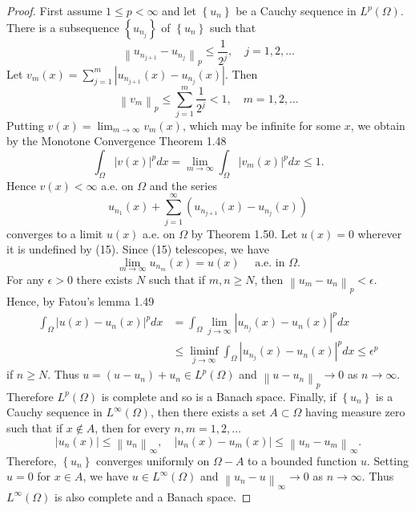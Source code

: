 \begin{proof}
  First assume $1 \leq p<\infty$ and let $\left\{u_n\right\}$ be a Cauchy sequence in $L^p(\Omega)$. There is a subsequence $\left\{u_{n_j}\right\}$ of $\left\{u_n\right\}$ such that
  \[
  \left\|u_{n_{j+1}}-u_{n_j}\right\|_p \leq \frac{1}{2^j}, \quad j=1,2, \ldots
  \]
  Let $v_m(x)=\sum_{j=1}^m\left|u_{n_{j+1}}(x)-u_{n_j}(x)\right|$. Then
  \[
  \left\|v_m\right\|_p \leq \sum_{j=1}^m \frac{1}{2^j}<1, \quad m=1,2, \ldots
  \]
  Putting $v(x)=\lim _{m \rightarrow \infty} v_m(x)$, which may be infinite for some $x$, we obtain by the Monotone Convergence Theorem 1.48
  \[
  \int_{\Omega}|v(x)|^p d x=\lim _{m \rightarrow \infty} \int_{\Omega}\left|v_m(x)\right|^p d x \leq 1 .
  \]
  Hence $v(x)<\infty$ a.e. on $\Omega$ and the series
  \begin{equation}\label{eq:2.15}
  u_{n_1}(x)+\sum_{j=1}^{\infty}\left(u_{n_{j+1}}(x)-u_{n_j}(x)\right)
  \end{equation}
  converges to a limit $u(x)$ a.e. on $\Omega$ by Theorem 1.50. Let $u(x)=0$ wherever it is undefined by (15). Since (15) telescopes, we have
  \[
  \lim _{m \rightarrow \infty} u_{n_m}(x)=u(x) \quad \text { a.e. in } \Omega.
  \]
  For any $\epsilon>0$ there exists $N$ such that if $m, n \geq N$, then $\left\|u_m-u_n\right\|_p<\epsilon$. Hence, by Fatou's lemma 1.49
  \[
  \begin{aligned}
  \int_{\Omega}\left|u(x)-u_n(x)\right|^p d x & =\int_{\Omega} \lim _{j \rightarrow \infty}\left|u_{n_j}(x)-u_n(x)\right|^p d x \\
  & \leq \liminf _{j \rightarrow \infty} \int_{\Omega}\left|u_{n_j}(x)-u_n(x)\right|^p d x \leq \epsilon^p
  \end{aligned}
  \]
  if $n \geq N$. Thus $u=\left(u-u_n\right)+u_n \in L^p(\Omega)$ and $\left\|u-u_n\right\|_p \rightarrow 0$ as $n \rightarrow \infty$. Therefore $L^p(\Omega)$ is complete and so is a Banach space.
  Finally, if $\left\{u_n\right\}$ is a Cauchy sequence in $L^{\infty}(\Omega)$, then there exists a set $A \subset \Omega$ having measure zero such that if $x \notin A$, then for every $n, m=1,2, \ldots$
  \[
  \left|u_n(x)\right| \leq\left\|u_n\right\|_{\infty}, \quad\left|u_n(x)-u_m(x)\right| \leq\left\|u_n-u_m\right\|_{\infty} .
  \]
  Therefore, $\left\{u_n\right\}$ converges uniformly on $\Omega-A$ to a bounded function $u$. Setting $u=0$ for $x \in A$, we have $u \in L^{\infty}(\Omega)$ and $\left\|u_n-u\right\|_{\infty} \rightarrow 0$ as $n \rightarrow \infty$. Thus $L^{\infty}(\Omega)$ is also complete and a Banach space.
\end{proof}

